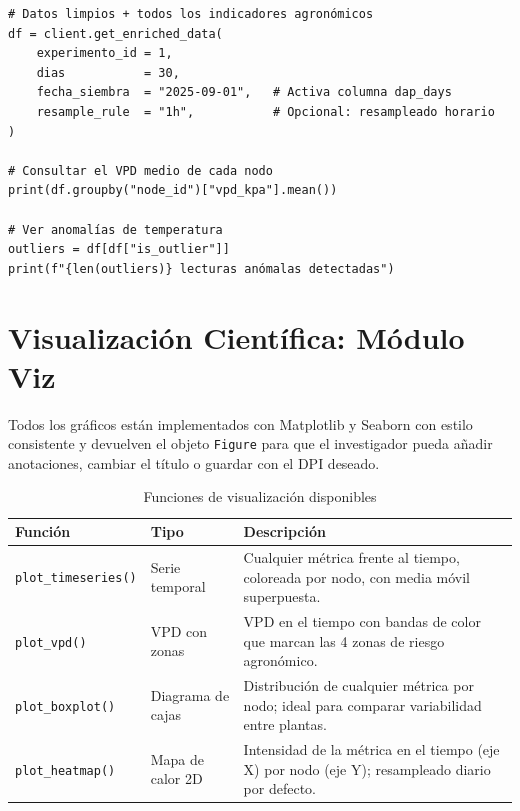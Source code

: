 \begin{lstlisting}[style=trama, caption={Pipeline completo con enriquecimiento}]
# Datos limpios + todos los indicadores agronómicos
df = client.get_enriched_data(
    experimento_id = 1,
    dias           = 30,
    fecha_siembra  = "2025-09-01",   # Activa columna dap_days
    resample_rule  = "1h",           # Opcional: resampleado horario
)

# Consultar el VPD medio de cada nodo
print(df.groupby("node_id")["vpd_kpa"].mean())

# Ver anomalías de temperatura
outliers = df[df["is_outlier"]]
print(f"{len(outliers)} lecturas anómalas detectadas")
\end{lstlisting}

\section{Visualización Científica: Módulo Viz}

Todos los gráficos están implementados con Matplotlib y Seaborn con estilo
consistente y devuelven el objeto \texttt{Figure} para que el investigador pueda
añadir anotaciones, cambiar el título o guardar con el DPI deseado.

\begin{table}[H]
    \centering
    \caption{Funciones de visualización disponibles}
    \begin{tabular}{llp{7cm}}
        \toprule
        \textbf{Función}          & \textbf{Tipo}          & \textbf{Descripción} \\
        \midrule
        \texttt{plot\_timeseries()} & Serie temporal         & Cualquier métrica frente al tiempo, coloreada por nodo, con media móvil superpuesta. \\
        \texttt{plot\_vpd()}        & VPD con zonas          & VPD en el tiempo con bandas de color que marcan las 4 zonas de riesgo agronómico. \\
        \texttt{plot\_boxplot()}    & Diagrama de cajas      & Distribución de cualquier métrica por nodo; ideal para comparar variabilidad entre plantas. \\
        \texttt{plot\_heatmap()}    & Mapa de calor 2D       & Intensidad de la métrica en el tiempo (eje X) por nodo (eje Y); resampleado diario por defecto. \\
        \bottomrule
    \end{tabular}
\end{table}

